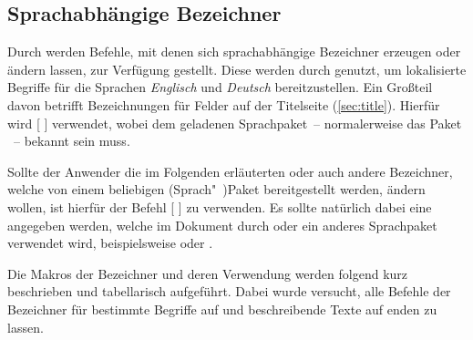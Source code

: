 \begin{Declaration*}{}
\begin{Declaration*}{}
\begin{Declaration*}{}
\section{Sprachabhängige Bezeichner}
%
%
%
%
Durch \KOMAScript{} werden Befehle, mit denen sich sprachabhängige Bezeichner 
erzeugen oder ändern lassen, zur Verfügung gestellt. Diese werden durch 
\TUDScript genutzt, um lokalisierte Begriffe für die Sprachen \emph{Englisch} 
und \emph{Deutsch} bereitzustellen. Ein Großteil davon betrifft Bezeichnungen 
für Felder auf der Titelseite (\autoref{sec:title}). Hierfür wird
[%
]
verwendet, wobei  dem geladenen Sprachpaket~-- normalerweise das 
Paket ~-- bekannt sein muss.

Sollte der Anwender die im Folgenden erläuterten oder auch andere Bezeichner, 
welche von einem beliebigen (Sprach"~)Paket bereitgestellt werden, ändern 
wollen, ist hierfür der Befehl
[%
] 
zu verwenden. Es sollte natürlich dabei eine  angegeben werden, 
welche im Dokument durch  oder ein anderes Sprachpaket verwendet 
wird, beispielsweise  oder . 

Die Makros der Bezeichner und deren Verwendung werden folgend kurz beschrieben 
und tabellarisch aufgeführt. Dabei wurde versucht, alle Befehle der Bezeichner 
für bestimmte Begriffe auf  und beschreibende 
Texte auf  enden zu lassen.


\end{Declaration*}
\end{Declaration*}
\end{Declaration*}
